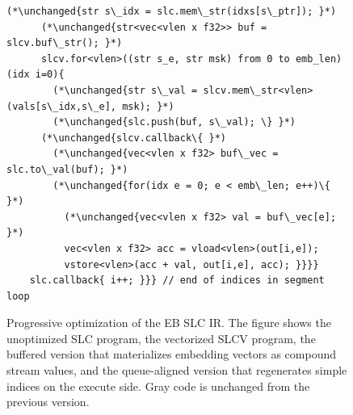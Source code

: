 \begin{figure}
    \begin{minipage}{\columnwidth}
    \begin{lstlisting}[basicstyle=\ttfamily\footnotesize,firstnumber=7]
      (*\unchanged{str s\_idx = slc.mem\_str(idxs[s\_ptr]); }*)
      (*\unchanged{str<vec<vlen x f32>> buf = slcv.buf\_str(); }*)
      slcv.for<vlen>((str s_e, str msk) from 0 to emb_len)(idx i=0){
        (*\unchanged{str s\_val = slcv.mem\_str<vlen>(vals[s\_idx,s\_e], msk); }*)
        (*\unchanged{slc.push(buf, s\_val); \} }*)
      (*\unchanged{slcv.callback\{ }*)
        (*\unchanged{vec<vlen x f32> buf\_vec = slc.to\_val(buf); }*)
        (*\unchanged{for(idx e = 0; e < emb\_len; e++)\{ }*)
          (*\unchanged{vec<vlen x f32> val = buf\_vec[e]; }*)
          vec<vlen x f32> acc = vload<vlen>(out[i,e]);
          vstore<vlen>(acc + val, out[i,e], acc); }}}}
    slc.callback{ i++; }}} // end of indices in segment loop
    \end{lstlisting}
    \vspace{-1em}
    \label{fig:ember-slc-aligned-code}
    \end{minipage}
    
    \vspace{-0.8em}
    \caption[Progressive SLC optimization steps.]{Progressive optimization of the EB SLC IR. The figure shows the unoptimized SLC program, the vectorized SLCV program, the buffered version that materializes embedding vectors as compound stream values, and the queue-aligned version that regenerates simple indices on the execute side. Gray code is unchanged from the previous version.}
    \label{fig:ember-slc-optimization-transformations}
\end{figure}
